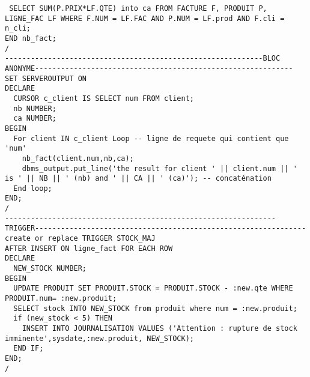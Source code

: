 \documentclass[11pt,a4paper,oneside,french,svgnames]{report}
\begin{document}
\begin{lstlisting}
 SELECT SUM(P.PRIX*LF.QTE) into ca FROM FACTURE F, PRODUIT P, LIGNE_FAC LF WHERE F.NUM = LF.FAC AND P.NUM = LF.prod AND F.cli = n_cli;
END nb_fact;
/
------------------------------------------------------------BLOC ANONYME------------------------------------------------------------
SET SERVEROUTPUT ON
DECLARE
  CURSOR c_client IS SELECT num FROM client;
  nb NUMBER; 
  ca NUMBER;
BEGIN
  For client IN c_client Loop -- ligne de requete qui contient que 'num'
    nb_fact(client.num,nb,ca);
    dbms_output.put_line('the result for client ' || client.num || ' is ' || NB || ' (nb) and ' || CA || ' (ca)'); -- concaténation
  End loop;
END;
/
---------------------------------------------------------------TRIGGER---------------------------------------------------------------
create or replace TRIGGER STOCK_MAJ
AFTER INSERT ON ligne_fact FOR EACH ROW
DECLARE
  NEW_STOCK NUMBER;
BEGIN
  UPDATE PRODUIT SET PRODUIT.STOCK = PRODUIT.STOCK - :new.qte WHERE PRODUIT.num= :new.produit;
  SELECT stock INTO NEW_STOCK from produit where num = :new.produit;
  if (new_stock < 5) THEN
    INSERT INTO JOURNALISATION VALUES ('Attention : rupture de stock imminente',sysdate,:new.produit, NEW_STOCK);
  END IF;
END;
/
\end{lstlisting}

\newpage
\end{document}
